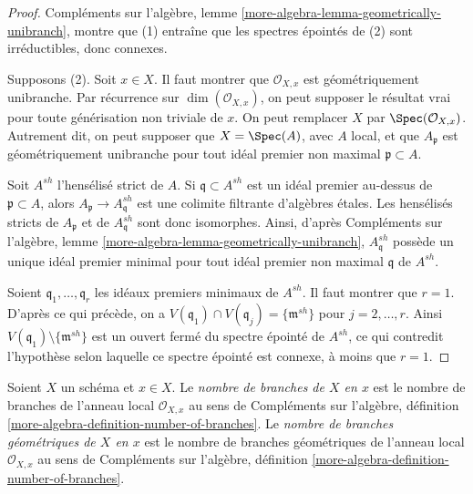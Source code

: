 \begin{proof}
Compléments sur l'algèbre, lemme \ref{more-algebra-lemma-geometrically-unibranch},
montre que (1) entraîne que les spectres épointés de
(2) sont irréductibles, donc connexes.

\medskip\noindent
Supposons (2). Soit $x \in X$. Il faut montrer que $\mathcal{O}_{X, x}$
est géométriquement unibranche. Par récurrence sur $\dim(\mathcal{O}_{X, x})$,
on peut supposer le résultat vrai pour toute générisation non triviale de $x$.
On peut remplacer $X$ par $\Spec(\mathcal{O}_{X, x})$. Autrement dit,
on peut supposer que $X = \Spec(A)$, avec $A$ local, et que
$A_\mathfrak p$ est géométriquement unibranche pour tout idéal premier non
maximal $\mathfrak p \subset A$.

\medskip\noindent
Soit $A^{sh}$ l'hensélisé strict de $A$. Si
$\mathfrak q \subset A^{sh}$ est un idéal premier au-dessus de $\mathfrak p \subset A$,
alors $A_\mathfrak p \to A^{sh}_\mathfrak q$ est
une colimite filtrante d'algèbres étales. Les hensélisés stricts de
$A_\mathfrak p$ et de $A^{sh}_\mathfrak q$ sont donc isomorphes.
Ainsi, d'après Compléments sur l'algèbre, lemme \ref{more-algebra-lemma-geometrically-unibranch},
$A^{sh}_\mathfrak q$
possède un unique idéal premier minimal pour tout idéal premier non maximal $\mathfrak q$ de
$A^{sh}$.

\medskip\noindent
Soient $\mathfrak q_1, \ldots, \mathfrak q_r$ les idéaux premiers minimaux
de $A^{sh}$. Il faut montrer que $r = 1$. D'après ce qui
précède, on a $V(\mathfrak q_1) \cap V(\mathfrak q_j) = \{\mathfrak m^{sh}\}$
pour $j = 2, \ldots, r$. Ainsi $V(\mathfrak q_1) \setminus \{\mathfrak m^{sh}\}$
est un ouvert fermé du spectre épointé de $A^{sh}$,
ce qui contredit l'hypothèse selon laquelle ce spectre épointé est
connexe, à moins que $r = 1$.
\end{proof}

\begin{definition}
\label{definition-number-of-branches}
Soient $X$ un schéma et $x \in X$. Le {\it nombre de branches de $X$
en $x$} est le nombre de branches de l'anneau local $\mathcal{O}_{X, x}$
au sens de
Compléments sur l'algèbre, définition \ref{more-algebra-definition-number-of-branches}.
Le {\it nombre de branches géométriques de $X$ en $x$} est le nombre de
branches géométriques de l'anneau local $\mathcal{O}_{X, x}$ au sens de
Compléments sur l'algèbre, définition \ref{more-algebra-definition-number-of-branches}.
\end{definition}

